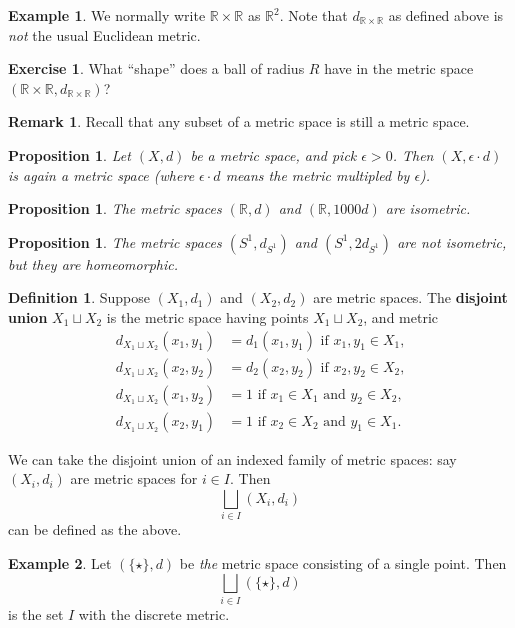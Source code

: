 \documentclass[12pt]{article}
\newcommand{\R}{\mathbb{R}}
\theoremstyle{plain}%
\newtheorem{proposition}[theorem]{Proposition}
\theoremstyle{definition}
\newtheorem{definition}{Definition}[theorem]
\newtheorem{example}{Example}[theorem]
\newtheorem{exercise}{Exercise}[theorem]
\newtheorem{remark}{Remark}[theorem]
\begin{document}
\begin{example}
We normally write $\R \times \R$ as $\R^2$.  Note that $d_{\R \times \R}$ as defined above is \textit{not} the usual Euclidean metric.
\end{example}

\begin{exercise}
What ``shape'' does a ball of radius $R$ have in the metric space $(\R \times \R, d_{\R \times \R})$?
\end{exercise}

\begin{remark}
Recall that any subset of a metric space is still a metric space.
\end{remark}

\begin{proposition}
  Let $(X,d)$ be a metric space, and pick $\epsilon > 0$.  Then $(X,
  \epsilon \cdot d)$ is again a metric space (where $\epsilon \cdot d$
  means the metric multipled by $\epsilon$).
\end{proposition}

\begin{proposition}
The  metric spaces $(\R, d)$ and $(\R, 1000d)$ are isometric.
\end{proposition}

\begin{proposition}
The  metric spaces $(S^1, d_{S^1})$ and $(S^1, 2 d_{S^1})$ are not isometric, but they are homeomorphic.
\end{proposition}

\begin{definition}
  Suppose $(X_1, d_1)$ and $(X_2, d_2)$ are metric spaces.  The \textbf{disjoint union} $X_1 \sqcup X_2$ is the metric space
having points $X_1 \sqcup X_2$, and metric
\begin{align*}
d_{X_1 \sqcup X_2}(x_1,y_1) &= d_1(x_1,y_1) \mbox{ if $x_1, y_1 \in X_1$,} \\
d_{X_1 \sqcup X_2}(x_2,y_2) &= d_2(x_2,y_2) \mbox{ if $x_2, y_2 \in X_2$,} \\
d_{X_1 \sqcup X_2}(x_1,y_2) &= 1 \mbox{ if $x_1 \in X_1$ and $y_2 \in X_2$,} \\
d_{X_1 \sqcup X_2}(x_2,y_1) &= 1 \mbox{ if $x_2 \in X_2$ and $y_1 \in X_1$.}
\end{align*}
\end{definition}
We can take the disjoint union of an indexed family of metric spaces: say $(X_i,d_i)$ are metric spaces for $i \in I$.  Then
$$
\bigsqcup_{i \in I} (X_i,d_i)
$$
can be defined as the above. 
\begin{example}
Let $(\{\star\}, d)$ be \textit{the} metric space consisting of a single point.  Then
$$
\bigsqcup_{i \in I} (\{\star\}, d)
$$
is the set $I$ with the discrete metric.
\end{example}
\end{document}
